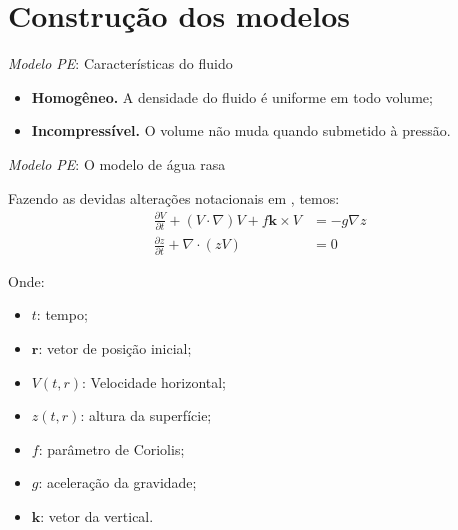 \section{Construção dos modelos} 


\begin{frame}{\textit{Modelo PE}: Características do fluido}
	\begin{itemize}
		\item \textbf{Homogêneo.} A densidade do fluido é uniforme em todo volume;
		\item \textbf{Incompressível.} O volume não muda quando submetido à pressão.
	\end{itemize}
\end{frame}


\begin{frame}{\textit{Modelo PE}: O modelo de água rasa}
		
	Fazendo as devidas alterações notacionais em \cite{salmon1998}, temos:
	\begin{align}
		\frac{\partial V}{\partial t} + (V \cdot \nabla)V + f \mathbf{k} \times V & = -g \nabla z \label{eq:agua-rasa-1} \\
		\frac{\partial z}{\partial t} + \nabla \cdot (z V)                        & = 0 \label{eq:agua-rasa-2}           
	\end{align}
		
	\begin{small}
		Onde:
		\begin{multicols}{2}
			\begin{itemize}
				\item $t$: tempo;
				\item $\mathbf{r}$: vetor de posição inicial;
				\item $V(t,r)$: Velocidade horizontal;
				\item $z(t,r)$: altura da superfície;
				\item $f$: parâmetro de Coriolis;
				\item $g$: aceleração da gravidade;
				\item $\mathbf{k}$: vetor da vertical.
			\end{itemize}
		\end{multicols}
	\end{small}
\end{frame}


